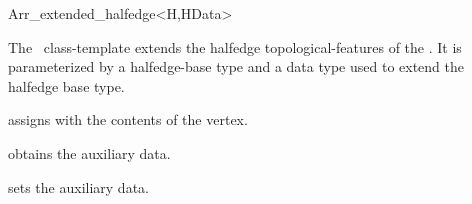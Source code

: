 
\ccRefPageBegin

\begin{ccRefClass}{Arr_extended_halfedge<H,HData>}

\ccDefinition
  The \ccRefName\ class-template extends the halfedge topological-features of
  the \dcel. It is parameterized by a halfedge-base type  and a data
  type  used to extend the halfedge base type.


\ccIsModel

\ccInheritsFrom

\ccCreation
{}
  {assigns \ccVar{} with the contents of the  vertex.}

\ccAccessFunctions
  {obtains the auxiliary data.}

\ccModifiers
  {sets the auxiliary data.}

\ccSeeAlso

\end{ccRefClass}

\ccRefPageEnd
